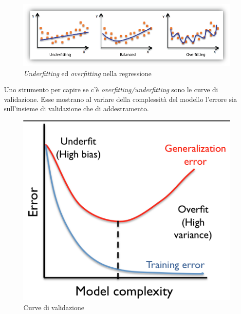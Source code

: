 \begin{figure}[H]
	\centering
	\includegraphics[width=1\linewidth]{img/underfittingoverfitting}
	\caption{\textit{Underfitting} ed \textit{overfitting} nella regressione}
	\label{fig:underfittingoverfitting}
\end{figure}

Uno strumento per capire se  c'\`e \textit{overfitting/underfitting} sono le curve di validazione. Esse mostrano al variare della complessit\`a del modello l'errore sia sull'insieme di validazione che di addestramento.

\begin{figure}[H]
	\centering
	\includegraphics[width=0.7\linewidth]{img/validation_curve}
	\caption{Curve di validazione}
	\label{fig:validationcurve}
\end{figure}

